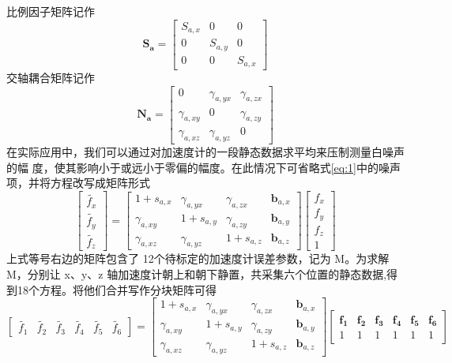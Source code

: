 \documentclass{ctexart}
\begin{document}
比例因子矩阵记作
\begin{equation}
\mathbf{S_{a}}=\begin{bmatrix}
S_{a,x}&0&0\\
0&S_{a,y}&0\\
0&0&S_{a,x}
\end{bmatrix}
\end{equation}
交轴耦合矩阵记作
\begin{equation}
\mathbf{N_{a}}=\begin{bmatrix}
0&\gamma_{a,yx}&\gamma_{a,zx}\\
\gamma_{a,xy}&0&\gamma_{a,zy}\\
\gamma_{a,xz}&\gamma_{a,yz}&0
\end{bmatrix}
\end{equation}
在实际应用中，我们可以通过对加速度计的一段静态数据求平均来压制测量白噪声的幅
度，使其影响小于或远小于零偏的幅度。在此情况下可省略式\eqref{eq:1}中的噪声项，并将方程改写成矩阵形式
\begin{equation}
\begin{bmatrix}
\tilde{f_{x}}\\
\tilde{f_{y}}\\
\tilde{f_{z}}
\end{bmatrix}=\begin{bmatrix}
1+s_{a,x}&\gamma_{a,yx}&\gamma_{a,zx}&\mathbf{b}_{a,x}\\
\gamma_{a,xy}&1+s_{a,y}&\gamma_{a,zy}&\mathbf{b}_{a,y}\\
\gamma_{a,xz}&\gamma_{a,yz}&1+s_{a,z}&\mathbf{b}_{a,z}
\end{bmatrix}\begin{bmatrix}
f_x\\
f_y\\
f_z\\
1\end{bmatrix}
\end{equation}
上式等号右边的矩阵包含了 12个待标定的加速度计误差参数，记为 M。为求解 M，分别让 x、y、z 轴加速度计朝上和朝下静置，共采集六个位置的静态数据,得到18个方程。将他们合并写作分块矩阵可得
\begin{equation}
\begin{bmatrix}
\tilde{f_{1}}&\tilde{f_{2}}&\tilde{f_{3}}&\tilde{f_{4}}&\tilde{f_{5}}&\tilde{f_{6}}
\end{bmatrix}=\begin{bmatrix}
1+s_{a,x}&\gamma_{a,yx}&\gamma_{a,zx}&\mathbf{b}_{a,x}\\
\gamma_{a,xy}&1+s_{a,y}&\gamma_{a,zy}&\mathbf{b}_{a,y}\\
\gamma_{a,xz}&\gamma_{a,yz}&1+s_{a,z}&\mathbf{b}_{a,z}
\end{bmatrix}\begin{bmatrix}
\mathbf{f_1}&\mathbf{f_2}&\mathbf{f_3}&\mathbf{f_4}&\mathbf{f_5}&\mathbf{f_6}\\
1&1&1&1&1&1
\label{eq:5}
\end{bmatrix}
\end{equation}
\end{document}
